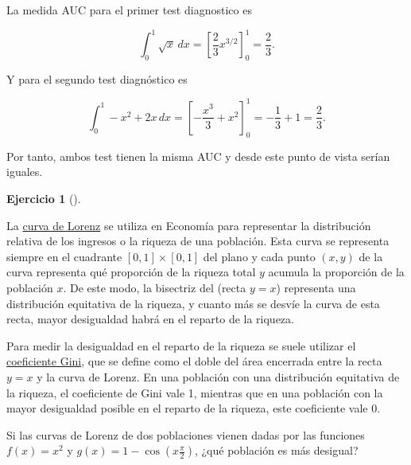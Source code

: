 \documentclass[
  a4paper,
]{scrreport}
\theoremstyle{definition}
\newtheorem{exercise}{Ejercicio}[chapter]
\theoremstyle{remark}
\begin{document}
\begin{tcolorbox}[enhanced jigsaw, colframe=quarto-callout-tip-color-frame, colbacktitle=quarto-callout-tip-color!10!white, opacitybacktitle=0.6, left=2mm, toptitle=1mm, coltitle=black, title=\textcolor{quarto-callout-tip-color}{\faLightbulb}\hspace{0.5em}{Solución}, leftrule=.75mm, opacityback=0, toprule=.15mm, colback=white, titlerule=0mm, arc=.35mm, rightrule=.15mm, bottomrule=.15mm, breakable, bottomtitle=1mm]

La medida AUC para el primer test diagnostico es

\[
\int_0^1 \sqrt{x}\,dx = \left[\frac{2}{3}x^{3/2}\right]_0^1 = \frac{2}{3}.
\]

Y para el segundo test diagnóstico es

\[
\int_0^1 -x^2+2x\,dx = \left[-\frac{x^3}{3}+x^2\right]_0^1 = -\frac{1}{3} + 1 = \frac{2}{3}.
\]

Por tanto, ambos test tienen la misma AUC y desde este punto de vista
serían iguales.

\end{tcolorbox}

\begin{exercise}[]\protect\hypertarget{exr-gini}{}\label{exr-gini}

La \href{https://es.wikipedia.org/wiki/Curva_de_Lorenz}{curva de Lorenz}
se utiliza en Economía para representar la distribución relativa de los
ingresos o la riqueza de una población. Esta curva se representa siempre
en el cuadrante \([0,1]\times [0,1]\) del plano y cada punto \((x,y)\)
de la curva representa qué proporción de la riqueza total \(y\) acumula
la proporción de la población \(x\). De este modo, la bisectriz del
(recta \(y=x\)) representa una distribución equitativa de la riqueza, y
cuanto más se desvíe la curva de esta recta, mayor desigualdad habrá en
el reparto de la riqueza.

Para medir la desigualdad en el reparto de la riqueza se suele utilizar
el \href{https://es.wikipedia.org/wiki/Coeficiente_de_Gini}{coeficiente
Gini}, que se define como el doble del área encerrada entre la recta
\(y=x\) y la curva de Lorenz. En una población con una distribución
equitativa de la riqueza, el coeficiente de Gini vale 1, mientras que en
una población con la mayor desigualdad posible en el reparto de la
riqueza, este coeficiente vale 0.

Si las curvas de Lorenz de dos poblaciones vienen dadas por las
funciones \(f(x)=x^2\) y \(g(x)=1-\cos\left(x\frac{\pi}{2}\right)\),
¿qué población es más desigual?

\end{exercise}
\end{document}
